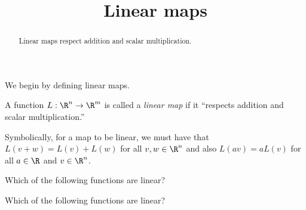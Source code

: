 \documentclass{ximera}
\title{Linear maps}
\begin{document}
\begin{abstract}
  Linear maps respect addition and scalar multiplication.
\end{abstract}

We begin by defining linear maps.

\begin{definition}
  A function $L: \R^n \to \R^m$ is called a \textit{linear map} if it
  ``respects addition and scalar multiplication.''

  Symbolically, for a map to be linear, we must have that $L(v+w) =
  L(v)+L(w)$ for all $v,w \in \R^n$ and also $L(av) = a L(v)$ for all
  $a \in \R$ and $v\in \R^n$.
\end{definition}

\begin{question}
  Which of the following functions are linear?
  \begin{solution}
    \begin{multiple-choice}

    \end{multiple-choice}
  \end{solution}
\end{question}

\begin{question}
  Which of the following functions are linear?
  \begin{solution}
    \begin{multiple-choice}
    \end{multiple-choice}
  \end{solution}
\end{question}
\end{document}
